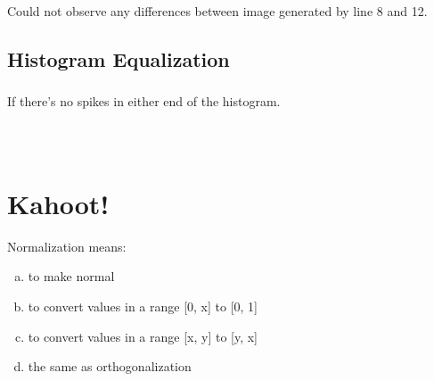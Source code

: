 \inputminted[linenos=true]{octave}{../code/exercise04-1.m}

Could not observe any differences between image generated by line 8 and 12.

\subsection{Histogram Equalization}
\subsubsection{}
If there's no spikes in either end of the histogram.

\subsubsection{}
\inputminted[linenos=true]{octave}{../code/exercise04-2.m}

\subsubsection{}
\inputminted[linenos=true]{octave}{../code/exercise04-3.m}

\section{Kahoot!}

Normalization means:
\begin{enumerate}[(a)]
    \item to make normal
    \item to convert values in a range [0, x] to [0, 1]
    \item to convert values in a range [x, y] to [y, x]
    \item the same as orthogonalization
\end{enumerate}


